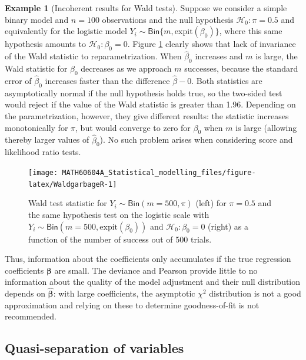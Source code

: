 \documentclass[
  11pt,
  letterpaper,
]{book}
\theoremstyle{definition}
\theoremstyle{definition}
\newtheorem{example}{Example}[chapter]
\theoremstyle{definition}
\theoremstyle{definition}
\theoremstyle{remark}
\begin{document}
\begin{example}[Incoherent results for Wald tests]
\protect\hypertarget{exm:waldgarbage}{}\label{exm:waldgarbage}Suppose we consider a simple binary model and \(n=100\) observations and the null hypothesis \(\mathscr{H}_0:\pi = 0.5\) and equivalently for the logistic model \(Y_i \sim \mathsf{Bin}\{m, \mathrm{expit}(\beta_0)\}\), where this same hypothesis amounts to \(\mathscr{H}_0:\beta_0=0\). Figure \ref{fig:WaldgarbageR} clearly shows that lack of invariance of the Wald statistic to reparametrization. When \(\widehat{\beta}_0\) increases and \(m\) is large, the Wald statistic for \(\beta_0\) decreases as we approach \(m\) successes, because the standard error of \(\widehat{\beta}_0\) increases faster than the difference \(\widehat{\beta}-0\). Both statistics are asymptotically normal if the null hypothesis holds true, so the two-sided test would reject if the value of the Wald statistic is greater than 1.96. Depending on the parametrization, however, they give different results: the statistic increases monotonically for \(\pi\), but would converge to zero for \(\beta_0\) when \(m\) is large (allowing thereby larger values of \(\widehat{\beta}_0\)). No such problem arises when considering score and likelihood ratio tests.
\end{example}

\begin{figure}

{\centering \texttt{[image: MATH60604A\_Statistical\_modelling\_files/figure-latex/WaldgarbageR-1]} 

}

\caption{Wald test statistic for $Y_i \sim \mathsf{Bin}(m=500, \pi)$ (left)  for $\pi=0.5$ and the same hypothesis test on the logistic scale with $Y_i \sim \mathsf{Bin}(m=500, \mathrm{expit}(\beta_0))$ and $\mathscr{H}_0:\beta_0=0$ (right) as a function of the number of success out of 500 trials.}\label{fig:WaldgarbageR}
\end{figure}

Thus, information about the coefficients only accumulates if the true
regression coefficients \(\boldsymbol{\beta}\) are small. The deviance and
Pearson provide little to no information about the quality of the model
adjustment and their null distribution depends on
\(\widehat{\boldsymbol{\beta}}\): with large coefficients, the asymptotic
\(\chi^2\) distribution is not a good approximation and relying on these
to determine goodness-of-fit is not recommended.

\hypertarget{quasi-separation-of-variables}{%
\subsection{Quasi-separation of variables}\label{quasi-separation-of-variables}}
\end{document}
